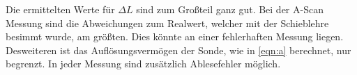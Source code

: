 
Die ermittelten Werte für $\Delta L$ sind zum Großteil ganz gut.
Bei der A-Scan Messung sind die Abweichungen zum Realwert, welcher mit der Schieblehre besimmt wurde, am größten.
Dies könnte an einer fehlerhaften Messung liegen. Desweiteren ist das Auflösungsvermögen der Sonde, wie in \ref{eqn:a} berechnet, nur begrenzt.
In jeder Messung sind zusätzlich Ablesefehler möglich.
